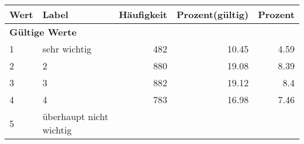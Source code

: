      \begin{longtable}{lXrrr}
     \toprule
     \textbf{Wert} & \textbf{Label} & \textbf{Häufigkeit} & \textbf{Prozent(gültig)} & \textbf{Prozent} \\
     \endhead
     \midrule
     \multicolumn{5}{l}{\textbf{Gültige Werte}}\\

     1 &
     \multicolumn{1}{X}{ sehr wichtig   } &


       \num{482} &
       \num[round-mode=places,round-precision=2]{10,45} &
         \num[round-mode=places,round-precision=2]{4,59} \\

     2 &
     \multicolumn{1}{X}{ 2   } &


       \num{880} &
       \num[round-mode=places,round-precision=2]{19,08} &
         \num[round-mode=places,round-precision=2]{8,39} \\

     3 &
     \multicolumn{1}{X}{ 3   } &


       \num{882} &
       \num[round-mode=places,round-precision=2]{19,12} &
         \num[round-mode=places,round-precision=2]{8,4} \\

     4 &
     \multicolumn{1}{X}{ 4   } &


       \num{783} &
       \num[round-mode=places,round-precision=2]{16,98} &
         \num[round-mode=places,round-precision=2]{7,46} \\

     5 &
     \multicolumn{1}{X}{ überhaupt nicht wichtig   } &



\end{longtable}
